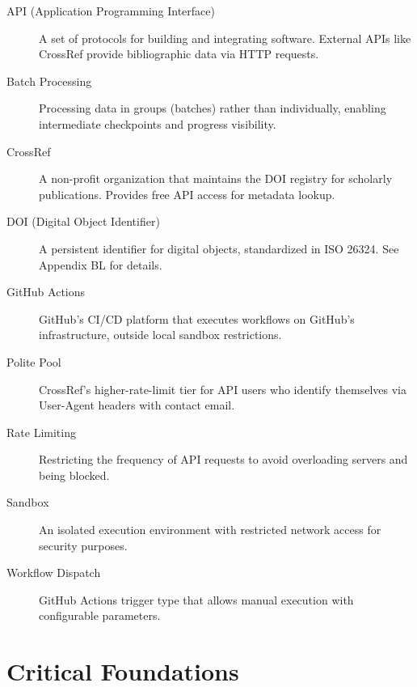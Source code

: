 \begin{description}
    \item[API (Application Programming Interface)] A set of protocols for building and integrating software. External APIs like CrossRef provide bibliographic data via HTTP requests.

    \item[Batch Processing] Processing data in groups (batches) rather than individually, enabling intermediate checkpoints and progress visibility.

    \item[CrossRef] A non-profit organization that maintains the DOI registry for scholarly publications. Provides free API access for metadata lookup.

    \item[DOI (Digital Object Identifier)] A persistent identifier for digital objects, standardized in ISO 26324. See Appendix BL for details.

    \item[GitHub Actions] GitHub's CI/CD platform that executes workflows on GitHub's infrastructure, outside local sandbox restrictions.

    \item[Polite Pool] CrossRef's higher-rate-limit tier for API users who identify themselves via User-Agent headers with contact email.

    \item[Rate Limiting] Restricting the frequency of API requests to avoid overloading servers and being blocked.

    \item[Sandbox] An isolated execution environment with restricted network access for security purposes.

    \item[Workflow Dispatch] GitHub Actions trigger type that allows manual execution with configurable parameters.
\end{description}

\section{Critical Foundations}
\label{sec:api-foundations}


